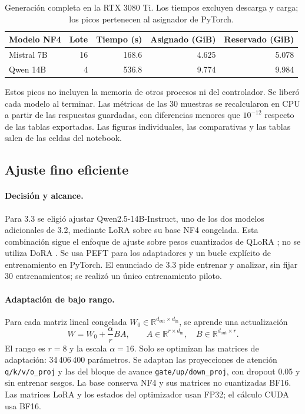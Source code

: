 \begin{table}[H]
\centering
\caption{Generación completa en la RTX 3080 Ti. Los tiempos excluyen descarga
y carga; los picos pertenecen al asignador de PyTorch.}
\begin{tabular}{lrrrr}
\toprule
Modelo NF4 & Lote & Tiempo (s) & Asignado (GiB) & Reservado (GiB)\\
\midrule
Mistral 7B & 16 & 168.6 & 4.625 & 5.078\\
Qwen 14B & 4 & 536.8 & 9.774 & 9.984\\
\bottomrule
\end{tabular}
\end{table}

Estos picos no incluyen la memoria de otros procesos ni del controlador.
Se liberó cada modelo al terminar. Las métricas de las 30 muestras se
recalcularon en CPU a partir de las respuestas guardadas, con diferencias
menores que $10^{-12}$ respecto de las tablas exportadas. Las figuras
individuales, las comparativas y las tablas salen de las celdas del notebook.

\subsection{Ajuste fino eficiente}
\label{sec:punto33}

\paragraph{Decisión y alcance.} Para 3.3 se eligió ajustar
Qwen2.5-14B-Instruct, uno de los dos modelos adicionales de 3.2, mediante
LoRA \cite{hu2021lora} sobre su base NF4 congelada. Esta combinación sigue
el enfoque de ajuste sobre pesos cuantizados de QLoRA
\cite{dettmers2023qlora,peft_lora_training}; no se utiliza DoRA
\cite{liu2024dora}. Se usa PEFT para los adaptadores y un bucle explícito
de entrenamiento en PyTorch. El enunciado de 3.3 pide entrenar y analizar,
sin fijar 30 entrenamientos; se realizó un único entrenamiento piloto.

\paragraph{Adaptación de bajo rango.} Para cada matriz lineal congelada
$W_0\in\mathbb{R}^{d_{\mathrm{out}}\times d_{\mathrm{in}}}$, se aprende
una actualización
\[
  W = W_0 + \frac{\alpha}{r}BA,\qquad
  A\in\mathbb{R}^{r\times d_{\mathrm{in}}},\quad
  B\in\mathbb{R}^{d_{\mathrm{out}}\times r}.
\]
El rango es $r=8$ y la escala $\alpha=16$. Solo se optimizan las matrices
de adaptación: 34\,406\,400 parámetros. Se adaptan las proyecciones de
atención \texttt{q/k/v/o\_proj} y las del bloque de avance
\texttt{gate/up/down\_proj}, con dropout 0.05 y sin entrenar sesgos.
La base conserva NF4 y sus matrices no cuantizadas BF16. Las matrices
LoRA y los estados del optimizador usan FP32; el cálculo CUDA usa BF16.

